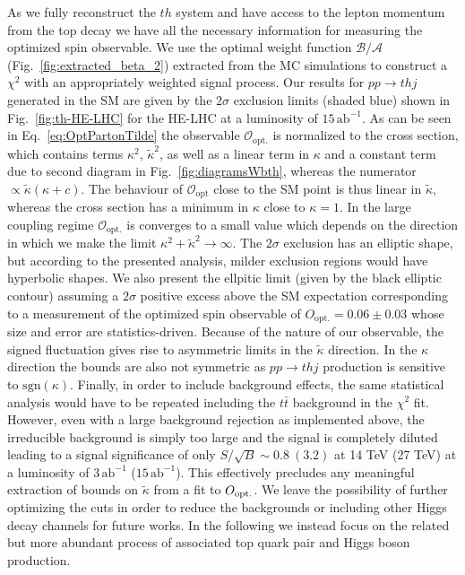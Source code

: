 \documentclass[11pt,a4paper]{article}
\newcommand{\mc}[1]{\mathcal{#1}}
\begin{document}
As we fully reconstruct the $th$ system and have access to the lepton momentum from the top decay we have all the necessary information for measuring the optimized spin observable. We use the optimal weight function $\mc{B}/\mc{A}$ (Fig.~\ref{fig:extracted_beta_2}) extracted from the MC simulations to construct a $\chi^2$ with an appropriately weighted signal process. Our results for $pp\to thj$ generated in the SM are given by the $2\sigma$ exclusion limits (shaded blue) shown in Fig.~\ref{fig:th-HE-LHC} for the HE-LHC at a luminosity of $15\,\text{ab}^{-1}$. As can be seen in Eq.~\eqref{eq:OptPartonTilde} the observable $\mc{O}_\mathrm{opt.}$ is normalized to the cross section, which contains terms $\kappa^2$, $\tilde \kappa^2$, as well as a linear term in $\kappa$ and a constant term due to second diagram in Fig.~\ref{fig:diagramsWbth}, whereas the numerator $\propto \tilde\kappa (\kappa+c)$. The behaviour of $\mc{O}_\mathrm{opt}$ close to the SM point is thus linear in $\tilde \kappa$, whereas the cross section has a minimum in $\kappa$ close to $\kappa=1$. In the large coupling regime $\mc{O}_\mathrm{opt.}$ is converges to a small value which depends on the direction in which we make the limit $\kappa^2 +  \tilde \kappa^2 \to \infty$. The $2\sigma$ exclusion has an elliptic shape, but according to the presented analysis, milder exclusion regions would have hyperbolic shapes.
We also present the ellpitic limit (given by the black elliptic contour) assuming a $2\sigma$ positive excess above the SM expectation corresponding to a measurement of the optimized spin observable of $O_{\text{opt.}}=0.06 \pm 0.03$ whose size and error are statistics-driven. Because of the nature of our observable, the signed fluctuation gives rise to asymmetric limits in the $\tilde\kappa$ direction. In the $\kappa$ direction the bounds are also not symmetric as $pp\to thj$ production is sensitive to $\text{sgn}(\kappa)$. 
Finally, in order to include background effects, the same statistical analysis would have to be repeated including the $t\bar t$ background in the $\chi^2$ fit. However, even with a large background rejection as implemented above, the irreducible background is simply too large and the signal is completely diluted leading to a signal significance of only $S/\sqrt{B} \sim 0.8~(3.2)$ at 14 TeV (27 TeV) at a luminosity of $3\,\text{ab}^{-1}$ ($15\,\text{ab}^{-1}$). This effectively precludes any meaningful extraction of bounds on $\tilde \kappa$ from a fit to $O_{\rm opt.}$. We leave the possibility of further optimizing the cuts in order to reduce the backgrounds or including other Higgs decay channels for future works. In the following we instead focus on the related but more abundant process of associated top quark pair and Higgs boson production.
\end{document}
